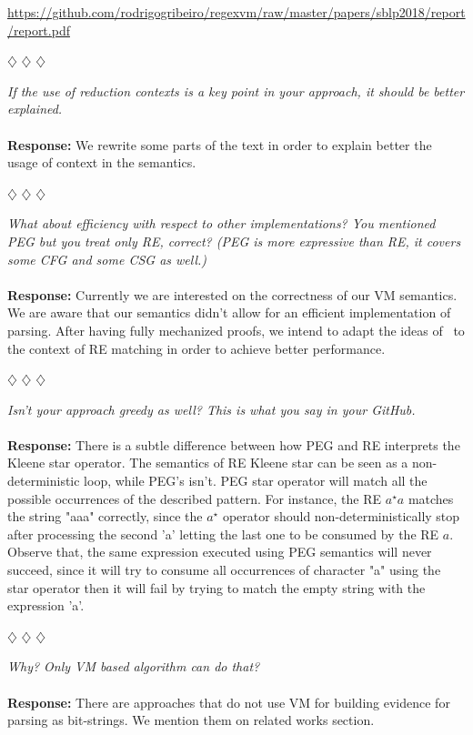 \documentclass{article}
\newcommand{\separador}{\begin{center}
$\diamondsuit$ $\diamondsuit$ $\diamondsuit$
\end{center}}
\newcommand{\report}{\begin{center}\url{https://github.com/rodrigogribeiro/regexvm/raw/master/papers/sblp2018/report/report.pdf}\end{center}}
\begin{document}
\report

\separador

\noindent\textit{If the use of reduction contexts is a key point in your approach, it should be better explained.}
\\
\\

\noindent\textbf{Response:} We rewrite some parts of the text in order to explain better the usage of context in the semantics.

\separador

\noindent\textit{What about efficiency with respect to other implementations? You mentioned PEG but you treat only RE, correct? (PEG is more expressive than RE, it covers some CFG and some CSG as well.)}
\\
\\
\noindent\textbf{Response:} Currently we are interested on the correctness of our VM semantics. We are aware that our semantics didn't allow for an efficient implementation of parsing.
After having fully mechanized proofs, we intend to adapt the ideas of~\cite{Johnson2013} to the context of RE matching in order to achieve better performance.

\separador

\noindent\textit{Isn’t your approach greedy as well? This is what you say in your GitHub.}
\\
\\
\noindent\textbf{Response:} There is a subtle difference between how PEG and RE interprets the Kleene star operator. The semantics of RE Kleene star can be seen as a
non-deterministic loop, while PEG's isn't. PEG star operator will match all the possible occurrences of the described pattern.
For instance, the RE $a^\star a$ matches the string "aaa" correctly, since the $a^\star$ operator should non-deterministically stop after processing the
second 'a' letting the last one to be consumed by the RE $a$. Observe that, the same expression executed using PEG semantics will never succeed,
since it will try to consume all occurrences of character "a" using the star operator then it will fail by trying to match the empty string with the expression 'a'.

\separador

\noindent\textit{Why? Only VM based algorithm can do that?}
\\
\\
\noindent\textbf{Response:} There are approaches that do not use VM for building evidence for parsing as bit-strings. We mention them on related works section.
\end{document}
